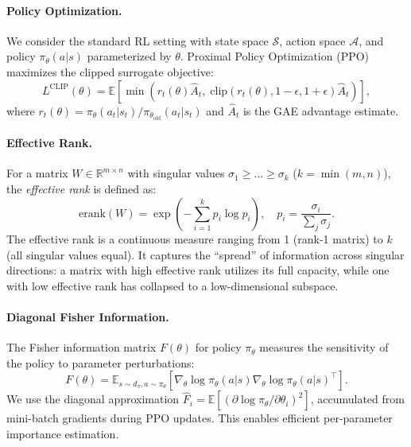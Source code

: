\documentclass{article}
\newcommand{\erank}{\mathrm{erank}}
\newcommand{\E}{\mathbb{E}}
\newcommand{\R}{\mathbb{R}}
\begin{document}
\paragraph{Policy Optimization.}
We consider the standard RL setting with state space $\mathcal{S}$, action space $\mathcal{A}$, and policy $\pi_\theta(a|s)$ parameterized by $\theta$. Proximal Policy Optimization (PPO) \citep{schulman2017ppo} maximizes the clipped surrogate objective:
\begin{equation}
    L^{\text{CLIP}}(\theta) = \E\left[\min\left(r_t(\theta)\hat{A}_t,\; \text{clip}(r_t(\theta), 1-\epsilon, 1+\epsilon)\hat{A}_t\right)\right],
\end{equation}
where $r_t(\theta) = \pi_\theta(a_t|s_t)/\pi_{\theta_{\text{old}}}(a_t|s_t)$ and $\hat{A}_t$ is the GAE advantage estimate.

\paragraph{Effective Rank.}
For a matrix $W \in \R^{m \times n}$ with singular values $\sigma_1 \geq \ldots \geq \sigma_k$ ($k = \min(m,n)$), the \emph{effective rank} \citep{roy2007effective} is defined as:
\begin{equation}
    \erank(W) = \exp\left(-\sum_{i=1}^{k} p_i \log p_i\right), \quad p_i = \frac{\sigma_i}{\sum_j \sigma_j}.
    \label{eq:erank}
\end{equation}
The effective rank is a continuous measure ranging from 1 (rank-1 matrix) to $k$ (all singular values equal). It captures the ``spread'' of information across singular directions: a matrix with high effective rank utilizes its full capacity, while one with low effective rank has collapsed to a low-dimensional subspace.

\paragraph{Diagonal Fisher Information.}
The Fisher information matrix $F(\theta)$ for policy $\pi_\theta$ measures the sensitivity of the policy to parameter perturbations:
\begin{equation}
    F(\theta) = \E_{s \sim d_\pi, a \sim \pi_\theta}\left[\nabla_\theta \log \pi_\theta(a|s) \nabla_\theta \log \pi_\theta(a|s)^\top\right].
\end{equation}
We use the diagonal approximation $\hat{F}_i = \E[(\partial \log \pi_\theta / \partial \theta_i)^2]$, accumulated from mini-batch gradients during PPO updates. This enables efficient per-parameter importance estimation.
\end{document}
